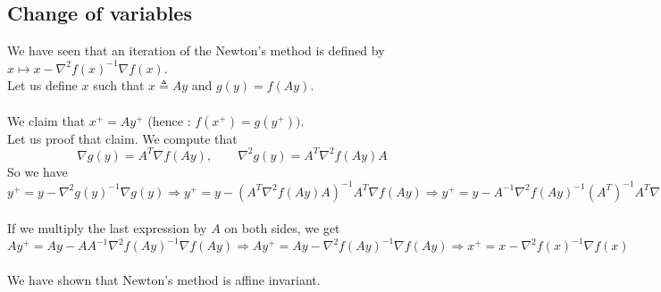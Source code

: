 \subsection{Change of variables}
We have seen that an iteration of the Newton's method is defined by $x \longmapsto x - \nabla^2f(x)^{-1}\nabla f(x)$. \\
Let us define $x$ such that $x \triangleq Ay$ and $g(y) = f(Ay)$. \\ \\
We claim that $x^+ = Ay^+$ (hence : $f(x^+) = g(y^+))$. \\
Let us proof that claim. We compute that
$$ \nabla g(y) = A^T \nabla f(Ay), \qquad \nabla^2 g(y) = A^T \nabla^2 f(Ay) A$$
So we have \\
$y^+ = y - \nabla^2 g(y)^{-1}\nabla g(y) \Longrightarrow y^+ = y - (A^T \nabla^2 f(Ay) A)^{-1} A^T \nabla f(Ay) \Longrightarrow y^+ = y - A^{-1} \nabla^2 f(Ay)^{-1} (A^{T})^{-1} A^T \nabla f(Ay)$ \\ \\
If we multiply the last expression by $A$ on both sides, we get \\
$ Ay^+ = Ay - AA^{-1} \nabla^2 f(Ay)^{-1} \nabla f(Ay) \Longrightarrow Ay^+ = Ay - \nabla^2 f(Ay)^{-1} \nabla f(Ay) \Longrightarrow x^+ = x - \nabla^2 f(x)^{-1} \nabla f(x)$ \\ \\
We have shown that Newton's method is affine invariant.


% 
